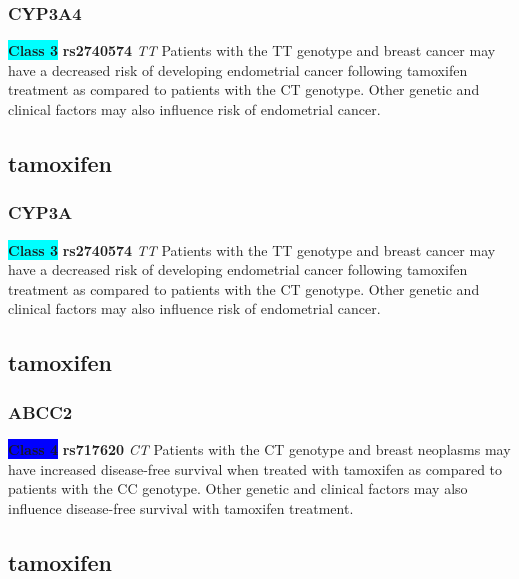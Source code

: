 \documentclass{book}
\begin{document}
\subsubsection{ CYP3A4 }

\begin{center}
\textbf{\colorbox{cyan} {Class 3}} \textbf{ rs2740574 } \textit{ TT }
Patients with the TT genotype and breast cancer may have a decreased risk of developing endometrial cancer following tamoxifen treatment as compared to patients with the CT genotype. Other genetic and clinical factors may also influence risk of endometrial cancer.


\end{center}\subsection{ tamoxifen }


\subsubsection{ CYP3A }

\begin{center}
\textbf{\colorbox{cyan} {Class 3}} \textbf{ rs2740574 } \textit{ TT }
Patients with the TT genotype and breast cancer may have a decreased risk of developing endometrial cancer following tamoxifen treatment as compared to patients with the CT genotype. Other genetic and clinical factors may also influence risk of endometrial cancer.


\end{center}\subsection{ tamoxifen }


\subsubsection{ ABCC2 }

\begin{center}

\textbf{\colorbox{blue} {Class 4}} \textbf{ rs717620 } \textit{ CT }
Patients with the CT genotype and breast neoplasms may have increased disease-free survival when treated with tamoxifen as compared to patients with the CC genotype. Other genetic and clinical factors may also influence disease-free survival with tamoxifen treatment.

\end{center}\subsection{ tamoxifen }
\end{document}
